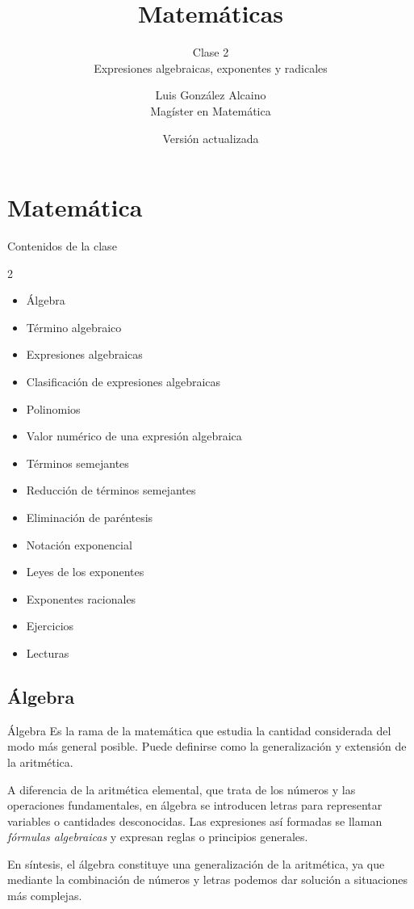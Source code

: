 \documentclass[10pt,handout,aspectratio=169]{beamer}
\title[Matemáticas]{Matemáticas}
\subtitle{Clase 2 \\ Expresiones algebraicas, exponentes y radicales}
\author[Luis González Alcaino]{Luis González Alcaino\\Magíster en Matemática}
\institute[UCM]{Universidad Católica del Maule\\Curicó}
\date{Versión actualizada}
\begin{document}
	
	\begin{frame}
		\titlepage
	\end{frame}
	
	\section{Matemática}
	
	\begin{frame}{Contenidos de la clase}
		\begin{multicols}{2}
			\begin{itemize}
				\item Álgebra
				\item Término algebraico
				\item Expresiones algebraicas
				\item Clasificación de expresiones algebraicas
				\item Polinomios
				\item Valor numérico de una expresión algebraica
				\item Términos semejantes
				\item Reducción de términos semejantes
				\item Eliminación de paréntesis
				\item Notación exponencial
				\item Leyes de los exponentes
				\item Exponentes racionales
				\item Ejercicios
				\item Lecturas
			\end{itemize}
		\end{multicols}
	\end{frame}
	
	\subsection{Álgebra}
	
	\begin{frame}{Álgebra}
		\justifying
		Es la rama de la matemática que estudia la cantidad considerada del modo más general posible. Puede definirse como la generalización y extensión de la aritmética.
		
		\bigskip
		
		A diferencia de la aritmética elemental, que trata de los números y las operaciones fundamentales, en álgebra se introducen letras para representar variables o cantidades desconocidas. Las expresiones así formadas se llaman \emph{fórmulas algebraicas} y expresan reglas o principios generales.
		
		\bigskip
		
		En síntesis, el álgebra constituye una generalización de la aritmética, ya que mediante la combinación de números y letras podemos dar solución a situaciones más complejas.
	\end{frame}
	
\end{document}
